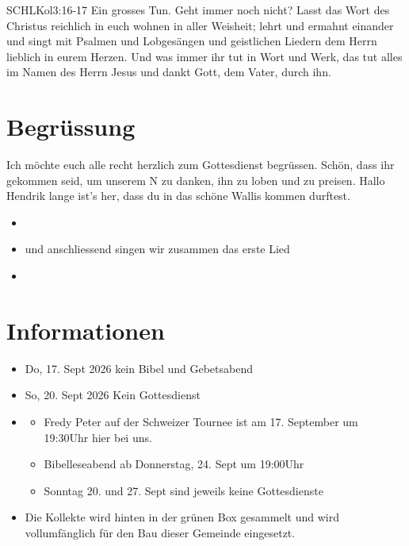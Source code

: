 \documentclass[fontsize=14pt]{mybib}
\author{OTS}
\newcommand{\Name}{Hendrik}
\begin{document}
\begin{bibelbox}{SCHL}{Kol}{3:16-17}
    Ein grosses Tun. Geht immer noch nicht? Lasst das Wort des Christus reichlich in euch wohnen in aller Weisheit; lehrt und ermahnt einander und singt mit Psalmen und Lobgesängen und geistlichen Liedern dem Herrn lieblich in eurem Herzen. Und was immer ihr tut in Wort und Werk, das tut alles im Namen des Herrn Jesus und dankt Gott, dem Vater, durch ihn.
\end{bibelbox}
\section{Begrüssung}
 Ich möchte euch alle recht herzlich zum Gottesdienst begrüssen. Schön, dass ihr gekommen seid, um unserem \herr N zu danken, ihn zu loben und zu preisen. 
Hallo \Name{} lange ist's her, dass du in das schöne Wallis kommen durftest.

\begin{itemize}
    \item {}
    \item und anschliessend singen wir zusammen das erste Lied
    \item {}
\end{itemize}

\section{Informationen}
\begin{itemize}
    \item {} Do, 17. Sept 2026 kein Bibel und Gebetsabend
    \item {} So, 20. Sept 2026 Kein Gottesdienst    
    \item {} 
    \begin{itemize}
        \item Fredy Peter auf der Schweizer Tournee ist am 17. September um 19:30Uhr hier bei uns.
        \item Bibelleseabend ab Donnerstag, 24. Sept um 19:00Uhr
        \item Sonntag 20. und 27. Sept sind jeweils keine Gottesdienste
    \end{itemize}        
    \item {} Die Kollekte wird hinten in der grünen Box gesammelt und wird vollumfänglich für den Bau dieser Gemeinde eingesetzt.
\end{itemize}
\end{document}
